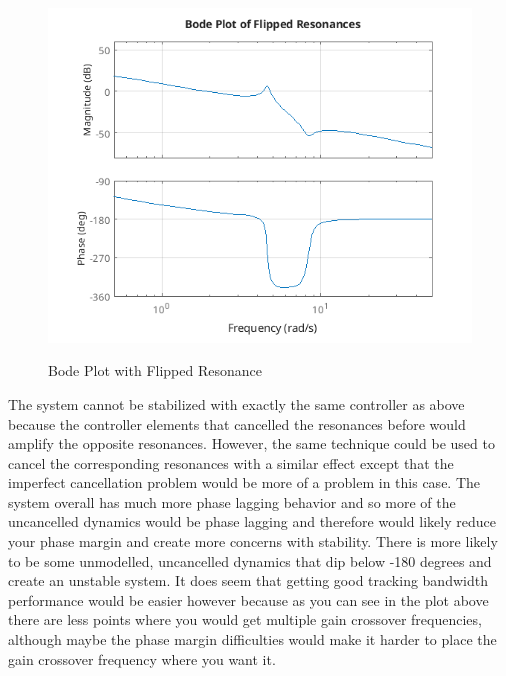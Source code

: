 \documentclass{article}
\begin{document}
\begin{figure}[H]
    \centering
    \includegraphics[width=\textwidth]{flippedResonancePlot.png}
    \label{fig:flippedResonancePlot}
    \caption{Bode Plot with Flipped Resonance}
\end{figure}

The system cannot be stabilized with exactly the same controller as above because the controller elements that cancelled the resonances before would amplify the opposite resonances.
However, the same technique could be used to cancel the corresponding resonances with a similar effect except that the imperfect cancellation problem would be more of a problem in this case.
The system overall has much more phase lagging behavior and so more of the uncancelled dynamics would be phase lagging and therefore would likely reduce your phase margin and create more concerns with stability.
There is more likely to be some unmodelled, uncancelled dynamics that dip below -180 degrees and create an unstable system.
It does seem that getting good tracking bandwidth performance would be easier however because as you can see in the plot above there are less points where you would get multiple gain crossover frequencies, although maybe the phase margin difficulties would make it harder to place the gain crossover frequency where you want it.
\end{document}
